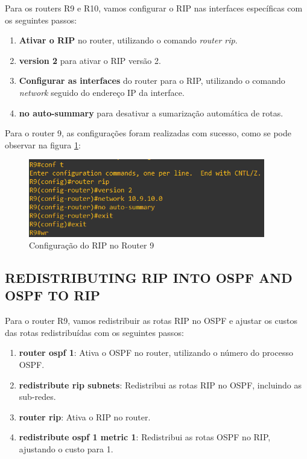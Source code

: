 \documentclass[11pt,english, openright, oneside]{book}
\begin{document}
Para os routers R9 e R10, vamos configurar o RIP nas interfaces específicas com os seguintes passos:
\vspace{0.2cm}

\begin{enumerate}
  \item \textbf{Ativar o RIP} no router, utilizando o comando \textit{router rip}.
  \item \textbf{version 2} para ativar o RIP versão 2.
  \item \textbf{Configurar as interfaces} do router para o RIP, utilizando o comando \textit{network} seguido do endereço IP da interface.
  \item \textbf{no auto-summary} para desativar a sumarização automática de rotas.
\end{enumerate}
\vspace{0.2cm}

Para o router 9, as configurações foram realizadas com sucesso, como se pode observar na figura \ref{fig:config31}:
\vspace{0.2cm}

\begin{figure}[H]
  \centering
  \includegraphics[width=0.92\textwidth]{imagens/Tarefa4/18.config_R9.png}
  \caption{Configuração do RIP no Router 9}
  \label{fig:config31}
\end{figure}
\vspace{0.2cm}

\subsection{REDISTRIBUTING RIP INTO OSPF AND OSPF TO RIP}
\vspace{0.2cm}

Para o router R9, vamos redistribuir as rotas RIP no OSPF e ajustar os custos das rotas redistribuídas com os seguintes passos:
\vspace{0.2cm}

\begin{enumerate}
  \item \textbf{router ospf 1}: Ativa o OSPF no router, utilizando o número do processo OSPF.
  \item \textbf{redistribute rip subnets}: Redistribui as rotas RIP no OSPF, incluindo as sub-redes.
  \item \textbf{router rip}: Ativa o RIP no router.
  \item \textbf{redistribute ospf 1 metric 1}: Redistribui as rotas OSPF no RIP, ajustando o custo para 1.
\end{enumerate}
\vspace{0.2cm}
\end{document}
